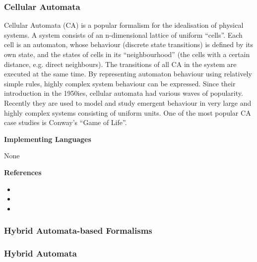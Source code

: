 \subsubsection{Cellular Automata}
\label{subsecF:CellularAutomata}


Cellular Automata (CA) is a popular formalism for the idealisation of physical systems.
A system consists of an n-dimensional lattice of uniform ``cells''. 
Each cell is an automaton, whose behaviour (discrete state transitions) is defined by its own state, and the states of cells in its ``neighbourhood'' (the cells with a certain distance, e.g. direct neighbours).
The transitions of all CA in the system are executed at the same time.
By representing automaton behaviour using relatively simple rules, highly complex system behaviour can be expressed. Since their introduction in the 1950ies, cellular automata had various waves of popularity.
Recently they are used to model and study emergent behaviour in very large and highly complex systems consisting of uniform units.
One of the most popular CA case studies is Conway's ``Game of Life''.

\textbf{Implementing Languages}

None




\itemCpsUsage {}

\itemCpsUsage {}

\itemCpsUsage {}


\textbf{References}
\begin{itemize}
	
\item {}
	
\item {}
	
\item {}
\end{itemize}
\subsubsection{Hybrid Automata-based Formalisms}

\subsubsection{Hybrid Automata}
\label{subsecF:HybridAutomata}



